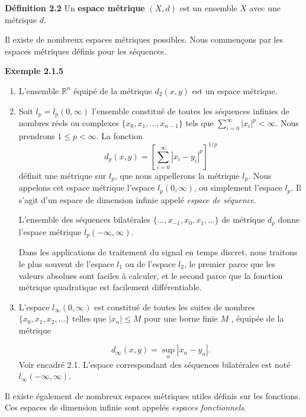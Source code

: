 \documentclass[11pt,twoside,a4paper]{article}
\begin{document}
\textbf{Définition 2.2} Un \textbf{espace métrique} $(X, d)$ est un ensemble $X$ avec une métrique $d$.

Il existe de nombreux espaces métriques possibles. Nous commençons par les espaces métriques définis pour les séquences.

\textbf{Exemple 2.1.5}
\begin{enumerate}
  \item L'ensemble $\mathbb{R}^n$ équipé de la métrique $d_2(x, y)$ est un espace métrique.
  \item Soit $l_p = l_p(0, \infty)$ l'ensemble constitué de toutes les séquences infinies de nombres réels ou complexes $\{x_0, x_1,...,x_{n-1}\}$ tels que
  $\sum_{i=0}^{\infty} |x_i|^p < \infty$. Nous prendrons $1 \leq p < \infty$. La fonction
  \begin{equation*}
    d_p(x, y) = \left[{\sum_{i=0}^{\infty} |x_i - y_i|^p}\right]^{1/p}
  \end{equation*}
  définit une métrique sur $l_p$, que nous appellerons la métrique $l_p$. Nous appelons cet espace métrique l'espace $l_p(0, \infty)$, ou simplement l'espace $l_p$. 
  Il s'agit d'un espace de dimension infinie appelé \textit{espace de séquence}.

  L'ensemble des séquences bilatérales $\{...,x_{-1}, x_0, x_1,...\}$ de métrique $d_p$ donne l'espace métrique $l_p(-\infty, \infty)$.

  Dans les applications de traitement du signal en temps discret, nous traitons le plus souvent de l'espace $l_1$ ou de l'espace $l_2$, le premier parce que les valeurs absolues sont faciles à calculer, et le second parce que la fonction métrique quadratique est facilement différentiable.

  \item L'espace $l_\infty(0, \infty)$ est constitué de toutes les suites de nombres $\{x_0, x_1, x_2,...\}$ telles que $|x_n| \leq M$ pour une borne finie $M$ , équipée de la métrique
  
  \begin{equation}
    d_\infty(x, y) = \sup\limits_n |x_n - y_n| .
  \end{equation}
  Voir encadré 2.1. L'espace correspondant des séquences bilatérales est noté $l_\infty(-\infty, \infty)$.
\end{enumerate}

Il existe également de nombreux espaces métriques utiles définis sur les fonctions. Ces espaces de dimension infinie sont appelés \textit{espaces fonctionnels}.
\end{document}
